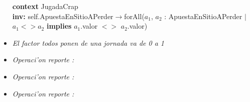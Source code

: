 \begin{itemize}
\textbf{context}  JugadaCrap \\ \textbf{inv:} 
  self.ApuestaEnSitioAPerder$\rightarrow$forAll($a_{1}$, $a_{2}$ : ApuestaEnSitioAPerder  $ | $ $a_{1} <> a_{2} $ \textbf{implies} $a_{1}$.valor $<>$ $a_{2}$.valor)


\item\textit{El factor todos ponen de una jornada va de 0 a 1}

\item\textit{Operaci'on reporte : }

\item\textit{Operaci'on reporte : }

\item\textit{Operaci'on reporte : }

\end{itemize}
